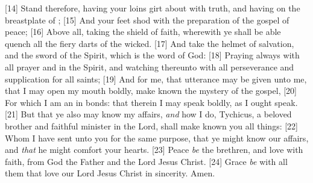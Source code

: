 [14] \textcolor[cmyk]{0.99998,1,0,0}{Stand therefore, having your loins girt about with truth, and having on the breastplate of ;}
[15] \textcolor[cmyk]{0.99998,1,0,0}{And your feet shod with the preparation of the gospel of peace;}
[16] \textcolor[cmyk]{0.99998,1,0,0}{Above all, taking the shield of faith, wherewith ye shall be able  quench all the fiery darts of the wicked.}
[17] \textcolor[cmyk]{0.99998,1,0,0}{And take the helmet of salvation, and the sword of the Spirit, which is the word of God:}
[18] \textcolor[cmyk]{0.99998,1,0,0}{Praying always with all prayer and  in the Spirit, and watching thereunto with all perseverance and supplication for all saints;}
[19] \textcolor[cmyk]{0.99998,1,0,0}{And for me, that utterance may be given unto me, that I may open my mouth boldly,  make known the mystery of the gospel,}
[20] \textcolor[cmyk]{0.99998,1,0,0}{For which I am an  in bonds: that therein I may speak boldly, as I ought  speak.}
[21] \textcolor[cmyk]{0.99998,1,0,0}{But that ye also may know my affairs, \emph{and} how I do, Tychicus, a beloved brother and faithful minister in the Lord, shall make known  you all things:}
[22] \textcolor[cmyk]{0.99998,1,0,0}{Whom I have sent unto you for the same purpose, that ye might know our affairs, and \emph{that} he might comfort your hearts.}
[23] \textcolor[cmyk]{0.99998,1,0,0}{Peace \emph{be}  the brethren, and love with faith, from God the Father and the Lord Jesus Christ.}
[24] \textcolor[cmyk]{0.99998,1,0,0}{Grace \emph{be} with all them that love our Lord Jesus Christ in sincerity. Amen.}